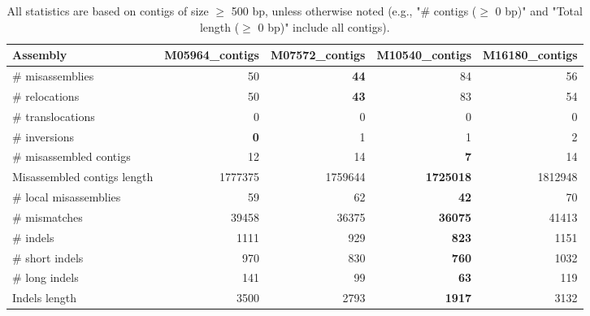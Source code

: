 \documentclass[12pt,a4paper]{article}
\begin{document}
\begin{table}[ht]
\begin{center}
\caption{All statistics are based on contigs of size $\geq$ 500 bp, unless otherwise noted (e.g., "\# contigs ($\geq$ 0 bp)" and "Total length ($\geq$ 0 bp)" include all contigs).}
\begin{tabular}{|l*{4}{|r}|}
\hline
Assembly & M05964\_contigs & M07572\_contigs & M10540\_contigs & M16180\_contigs \\ \hline
\# misassemblies & 50 & {\bf 44} & 84 & 56 \\ \hline
\hspace{5mm}\# relocations & 50 & {\bf 43} & 83 & 54 \\ \hline
\hspace{5mm}\# translocations & 0 & 0 & 0 & 0 \\ \hline
\hspace{5mm}\# inversions & {\bf 0} & 1 & 1 & 2 \\ \hline
\# misassembled contigs & 12 & 14 & {\bf 7} & 14 \\ \hline
Misassembled contigs length & 1777375 & 1759644 & {\bf 1725018} & 1812948 \\ \hline
\# local misassemblies & 59 & 62 & {\bf 42} & 70 \\ \hline
\# mismatches & 39458 & 36375 & {\bf 36075} & 41413 \\ \hline
\# indels & 1111 & 929 & {\bf 823} & 1151 \\ \hline
\hspace{5mm}\# short indels & 970 & 830 & {\bf 760} & 1032 \\ \hline
\hspace{5mm}\# long indels & 141 & 99 & {\bf 63} & 119 \\ \hline
Indels length & 3500 & 2793 & {\bf 1917} & 3132 \\ \hline
\end{tabular}
\end{center}
\end{table}
\end{document}

